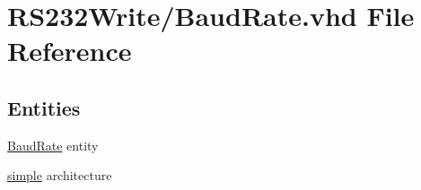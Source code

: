 \hypertarget{_r_s232_write_2_baud_rate_8vhd}{}\section{R\+S232\+Write/\+Baud\+Rate.vhd File Reference}
\label{_r_s232_write_2_baud_rate_8vhd}
\subsection*{Entities}
\begin{DoxyCompactItemize}
\item 
\hyperlink{class_baud_rate}{Baud\+Rate} entity
\item 
\hyperlink{class_baud_rate_1_1simple}{simple} architecture
\end{DoxyCompactItemize}
